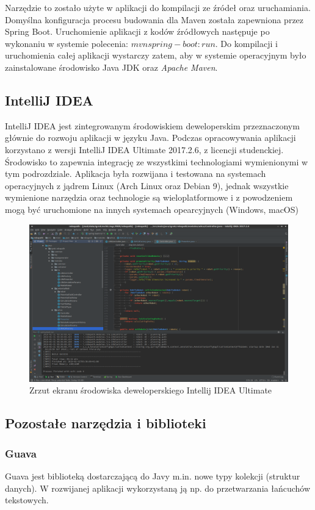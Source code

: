 Narzędzie to zostało użyte w aplikacji do kompilacji ze źródeł oraz uruchamiania. Domyślna konfiguracja procesu budowania dla Maven została zapewniona przez Spring Boot. Uruchomienie aplikacji z kodów źródłowych następuje po wykonaniu w systemie polecenia: $mvn spring-boot:run$.
Do kompilacji i uruchomienia całej aplikacji wystarczy zatem, aby w systemie operacyjnym było zainstalowane środowisko Java JDK oraz {\it Apache Maven}.

\subsection{IntelliJ IDEA}
IntelliJ IDEA jest zintegrowanym środowiskiem deweloperskim przeznaczonym głównie do rozwoju aplikacji w języku Java.
Podczas opracowywania aplikacji korzystano z wersji IntelliJ IDEA Ultimate 2017.2.6, z licencji studenckiej.
Środowisko to zapewnia integrację ze wszystkimi technologiami wymienionymi w tym podrozdziale.
Aplikacja była rozwijana i testowana na systemach operacyjnych z jądrem Linux (Arch Linux oraz Debian 9), jednak wszystkie wymienione narzędzia oraz technologie są wieloplatformowe i z powodzeniem mogą być uruchomione na innych systemach opearcyjnych (Windows, macOS)

\begin{figure}
	\centering
	\includegraphics[width=0.9\columnwidth]{img/robopath/intellij}
	\caption{Zrzut ekranu środowiska deweloperskiego Intellij IDEA Ultimate}
	\label{fig:app-tech-intellij}
\end{figure}

\subsection{Pozostałe narzędzia i biblioteki}
\subsubsection{Guava}
Guava jest biblioteką dostarczającą do Javy m.in. nowe typy kolekcji (struktur danych). W rozwijanej aplikacji wykorzystaną ją np. do przetwarzania łańcuchów tekstowych.

